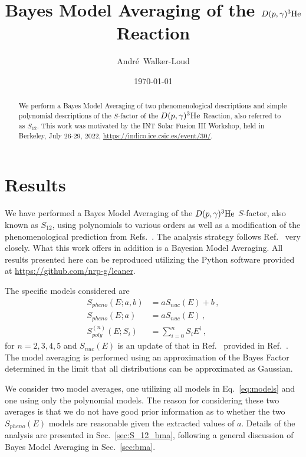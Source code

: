\documentclass[prd,10pt,superscriptaddress,notitlepage,tightenlines,nofootinbib,floatfix]{revtex4-1}
\begin{document}
\title{Bayes Model Averaging of the $D(p,{\gamma})^3{\rm He}$ Reaction}


\author{Andr\'{e}~Walker-Loud}

\date{\today}

\begin{abstract}
We perform a Bayes Model Averaging of two phenomenological descriptions and simple polynomial descriptions of the $S$-factor of the $D(p,{\gamma})^3{\rm He}$ Reaction, also referred to as $S_{12}$.
This work was motivated by the INT Solar Fusion III Workshop, held in Berkeley, July 26-29, 2022, \url{https://indico.ice.csic.es/event/30/}.
\end{abstract}
\maketitle
\tableofcontents

\section{Results}
We have performed a Bayes Model Averaging of the $D(p,{\gamma})^3{\rm He}$ $S$-factor, also known as $S_{12}$, using polynomials to various orders as well as a modification of the phenomenological prediction from Refs.~\cite{Marcucci:2005zc,Marcucci:2015yla}.
The analysis strategy follows Ref.~\cite{Moscoso:2021xog} very closely.
What this work offers in addition is a Bayesian Model Averaging.
All results presented here can be reproduced utilizing the Python software provided at \url{https://github.com/nrp-g/leaner}.



The specific models considered are 
\begin{align}\label{eq:models}
S_{pheno}(E; a, b) &= a S_{nuc}(E) + b\, ,
\nonumber\\
S_{pheno}(E; a) &= a S_{nuc}(E)\, ,
\nonumber\\
S_{poly}^{(n)}(E; S_i) &= \sum_{i=0}^n S_i E^i\, ,
\end{align}
for $n=2,3,4,5$ and $S_{nuc}(E)$ is an update of that in Ref.~\cite{Marcucci:2005zc} provided in Ref.~\cite{Marcucci:2015yla}.
The model averaging is performed using an approximation of the Bayes Factor determined in the limit that all distributions can be approximated as Gaussian.

We consider two model averages, one utilizing all models in Eq.~\eqref{eq:models} and one using only the polynomial models.  The reason for considering these two averages is that we do not have good prior information as to whether the two $S_{pheno}(E)$ models are reasonable given the extracted values of $a$.
Details of the analysis are presented in Sec.~\ref{sec:S_12_bma}, following a general discussion of Bayes Model Averaging in Sec.~\ref{sec:bma}.
\end{document}
